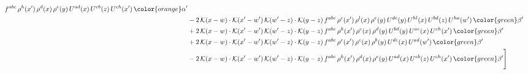 \begin{align}
f^{abc}\,\rho^{h}(x')\,\rho^{d}(x)\,\rho^{e}(y)\,U^{ad}(x)\,U^{eb}(z)\,U^{ch}(x')\,{\color{orange} \alpha'}\notag\\ & -2\,\mathcal{K}(x-w)\cdot\mathcal{K}(x'-w')\,\mathcal{K}(w'-z)\cdot\mathcal{K}(y-z)\, f^{abc}\,\rho^{c}(x')\,\rho^{l}(x)\,\rho^{e}(y)\,U^{de}(y)\,U^{hl}(x)\,U^{bd}(z)\,U^{ha}(w')\,{\color{green} \beta'}\notag\\ &+2\,\mathcal{K}(x-w)\cdot\mathcal{K}(x'-w')\,\mathcal{K}(w'-z)\cdot\mathcal{K}(y-z)\, f^{abc}\,\rho^{h}(x')\,\rho^{e}(x)\,\rho^{d}(y)\,U^{bd}(y)\,U^{ae}(x)\,U^{ch}(x')\,{\color{green} \beta'}\notag\\ &+2\,\mathcal{K}(x-w)\cdot\mathcal{K}(x'-w')\,\mathcal{K}(w'-z)\cdot\mathcal{K}(y-z)\, f^{abc}\,\rho^{c}(x')\,\rho^{e}(x)\,\rho^{b}(y)\,U^{de}(x)\,U^{ad}(w')\,{\color{green} \beta'}\notag\\ & -2\,\mathcal{K}(x-w)\cdot\mathcal{K}(x'-w')\,\mathcal{K}(w'-z)\cdot\mathcal{K}(y-z)\, f^{abc}\,\rho^{h}(x')\,\rho^{d}(x)\,\rho^{e}(y)\,U^{ad}(x)\,U^{eb}(z)\,U^{ch}(x')\,{\color{green} \beta'}\Bigg] 
\end{align}     
